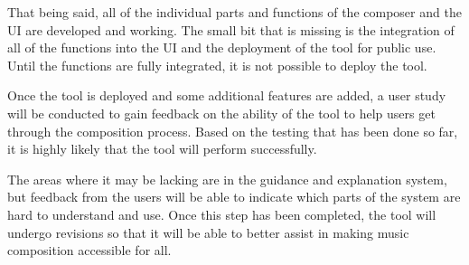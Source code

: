 That being said, all of the individual parts and functions of the composer and the UI are developed and working.  The small bit that is missing is the integration of all of the functions into the UI and the deployment of the tool for public use.  Until the functions are fully integrated, it is not possible to deploy the tool.

\vspace{\baselineskip}

Once the tool is deployed and some additional features are added, a user study will be conducted to gain feedback on the ability of the tool to help users get through the composition process.  Based on the testing that has been done so far, it is highly likely that the tool will perform successfully.

\vspace{\baselineskip}

The areas where it may be lacking are in the guidance and explanation system, but feedback from the users will be able to indicate which parts of the system are hard to understand and use.  Once this step has been completed, the tool will undergo revisions so that it will be able to better assist in making music composition accessible for all.